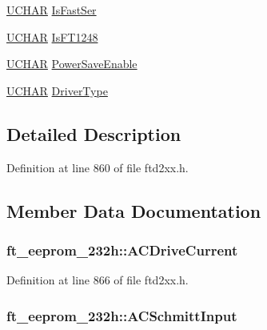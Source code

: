 \begin{DoxyCompactItemize}
\item 
\hyperlink{LALUsbx64_2include_2WinTypes_8h_a4f4bb67531a9bf6f0b9c6ad76aeba587}{UCHAR} \hyperlink{structft__eeprom__232h_ad214d1fe4bf5bf916c5364777f9dc1a8}{IsFastSer}
\item 
\hyperlink{LALUsbx64_2include_2WinTypes_8h_a4f4bb67531a9bf6f0b9c6ad76aeba587}{UCHAR} \hyperlink{structft__eeprom__232h_aa2b426719debc007b4ce6166524ca68f}{IsFT1248}
\item 
\hyperlink{LALUsbx64_2include_2WinTypes_8h_a4f4bb67531a9bf6f0b9c6ad76aeba587}{UCHAR} \hyperlink{structft__eeprom__232h_a60637cdb433234aa02093455605abca9}{PowerSaveEnable}
\item 
\hyperlink{LALUsbx64_2include_2WinTypes_8h_a4f4bb67531a9bf6f0b9c6ad76aeba587}{UCHAR} \hyperlink{structft__eeprom__232h_a629a028c1c415f2f9104fe7e30154039}{DriverType}
\end{DoxyCompactItemize}


\subsection{Detailed Description}


Definition at line 860 of file ftd2xx.h.

\subsection{Member Data Documentation}
\hypertarget{structft__eeprom__232h_a8cb3fbf23ced09e59165178aee3f3c57}{
\subsubsection[{ACDriveCurrent}]{ {\bf ft\_\-eeprom\_\-232h::ACDriveCurrent}}}
\label{structft__eeprom__232h_a8cb3fbf23ced09e59165178aee3f3c57}


Definition at line 866 of file ftd2xx.h.\hypertarget{structft__eeprom__232h_a025e35a0ae019370a4ea968f1cc2df2b}{
\subsubsection[{ACSchmittInput}]{ {\bf ft\_\-eeprom\_\-232h::ACSchmittInput}}}
\label{structft__eeprom__232h_a025e35a0ae019370a4ea968f1cc2df2b}


